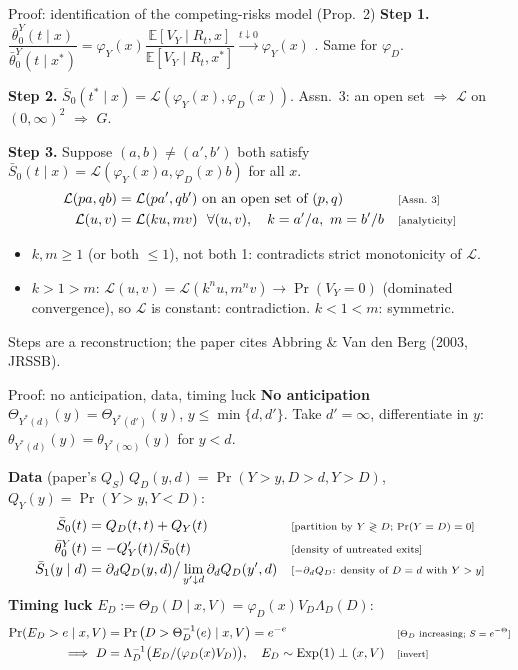 \documentclass[aspectratio=169,10pt]{beamer}
\newcommand{\E}{\mathbb{E}}
\newcommand{\Lap}{\mathcal{L}}
\newcommand{\why}[1]{\text{\scriptsize[#1]}}
\begin{document}
\begin{frame}[label=p-ts]{Proof: identification of the competing-risks model (Prop.~2)}
  \small
  \textbf{Step 1.} $\dfrac{\bar\theta^Y_0(t\mid x)}{\bar\theta^Y_0(t\mid x^*)}=\varphi_Y(x)\dfrac{\E[V_Y\mid R_t,x]}{\E[V_Y\mid R_t,x^*]}\xrightarrow{t\downarrow0}\varphi_Y(x)$ \why{$R_t\to$ everyone; $V\perp X$; $\E V_Y<\infty$}. Same for $\varphi_D$.

  \medskip
  \textbf{Step 2.} $\bar S_0(t^*\mid x)=\Lap(\varphi_Y(x),\varphi_D(x))$. Assn.~3: an open set $\Rightarrow$ $\Lap$ on $(0,\infty)^2$ $\Rightarrow$ $G$.

  \medskip
  \textbf{Step 3.} Suppose $(a,b)\neq(a',b')$ both satisfy $\bar S_0(t\mid x)=\Lap(\varphi_Y(x)a,\varphi_D(x)b)$ for all $x$.
  \begin{align*}
    \Lap(pa,qb) &= \Lap(pa',qb') \text{ on an open set of }(p,q) && \why{Assn.~3} \\
    \Lap(u,v) &= \Lap(ku,mv)\ \ \forall(u,v),\quad k=a'/a,\ m=b'/b && \why{analyticity}
  \end{align*}
  \begin{itemize}
    \item $k,m\ge1$ (or both $\le1$), not both 1: contradicts strict monotonicity of $\Lap$.
    \item $k>1>m$: $\Lap(u,v)=\Lap(k^nu,m^nv)\to\Pr(V_Y=0)$ (dominated convergence), so $\Lap$ is constant: contradiction. $k<1<m$: symmetric.
  \end{itemize}
  Steps are a reconstruction; the paper cites Abbring \& Van den Berg (2003, JRSSB).
\end{frame}

\begin{frame}[label=p-treat]{Proof: no anticipation, data, timing luck}
  \small
  \textbf{No anticipation} $\Theta_{Y^*(d)}(y)=\Theta_{Y^*(d')}(y)$, $y\le\min\{d,d'\}$. Take $d'=\infty$, differentiate in $y$: $\theta_{Y^*(d)}(y)=\theta_{Y^*(\infty)}(y)$ for $y<d$.

  \medskip
  \textbf{Data} (paper's $Q_S$) $Q_D(y,d)=\Pr(Y>y,D>d,Y>D)$, $Q_Y(y)=\Pr(Y>y,Y<D)$:
  \begin{align*}
    \bar S_0(t) &= Q_D(t,t)+Q_Y(t) && \why{partition by $Y\gtrless D$; $\Pr(Y=D)=0$} \\
    \bar\theta^Y_0(t) &= -Q_Y'(t)/\bar S_0(t) && \why{density of untreated exits} \\
    \bar S_1(y\mid d) &= \partial_dQ_D(y,d)\big/\lim_{y'\downarrow d}\partial_dQ_D(y',d) && \why{$-\partial_dQ_D$: density of $D=d$ with $Y>y$}
  \end{align*}
  \textbf{Timing luck} $E_D:=\Theta_D(D\mid x,V)=\varphi_D(x)V_D\Lambda_D(D)$:
  \begin{align*}
    \Pr(E_D>e\mid x,V) &= \Pr\big(D>\Theta_D^{-1}(e)\mid x,V\big) = e^{-e} && \why{$\Theta_D$ increasing; $S=e^{-\Theta}$} \\
    \Longrightarrow\ D &= \Lambda_D^{-1}\big(E_D/(\varphi_D(x)V_D)\big),\quad E_D\sim\text{Exp}(1)\perp(x,V) && \why{invert}
  \end{align*}
\end{frame}
\end{document}

